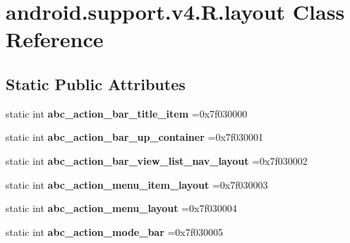 \hypertarget{classandroid_1_1support_1_1v4_1_1R_1_1layout}{}\section{android.\+support.\+v4.\+R.\+layout Class Reference}
\label{classandroid_1_1support_1_1v4_1_1R_1_1layout}
\subsection*{Static Public Attributes}
\begin{DoxyCompactItemize}
\item 
\mbox{\label{classandroid_1_1support_1_1v4_1_1R_1_1layout_a32dae27e9fac645a3a32574ce9505741}} 
static int {\bfseries abc\+\_\+action\+\_\+bar\+\_\+title\+\_\+item} =0x7f030000
\item 
\mbox{\label{classandroid_1_1support_1_1v4_1_1R_1_1layout_a6099d40720cf64b9b24bc43b7f62b810}} 
static int {\bfseries abc\+\_\+action\+\_\+bar\+\_\+up\+\_\+container} =0x7f030001
\item 
\mbox{\label{classandroid_1_1support_1_1v4_1_1R_1_1layout_a9ee0048807b5c4fefa7d031f3a6de536}} 
static int {\bfseries abc\+\_\+action\+\_\+bar\+\_\+view\+\_\+list\+\_\+nav\+\_\+layout} =0x7f030002
\item 
\mbox{\label{classandroid_1_1support_1_1v4_1_1R_1_1layout_acfd981c8bbd6284f743190306cc38d3d}} 
static int {\bfseries abc\+\_\+action\+\_\+menu\+\_\+item\+\_\+layout} =0x7f030003
\item 
\mbox{\label{classandroid_1_1support_1_1v4_1_1R_1_1layout_a4ce71beb0ef6a68f51b3b5a7e6692d84}} 
static int {\bfseries abc\+\_\+action\+\_\+menu\+\_\+layout} =0x7f030004
\item 
\mbox{\label{classandroid_1_1support_1_1v4_1_1R_1_1layout_ad185f4bf9adfc026b5177f3e1c59447b}} 
static int {\bfseries abc\+\_\+action\+\_\+mode\+\_\+bar} =0x7f030005
\item 

\end{DoxyCompactItemize}
